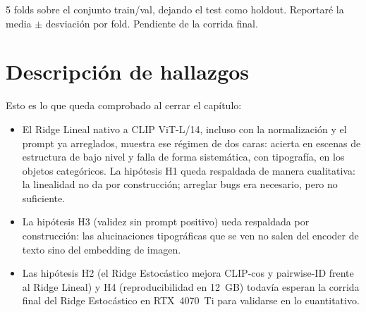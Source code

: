5 folds sobre el conjunto train/val, dejando el test como holdout. Reportaré la media $\pm$ 
desviación por fold. Pendiente de la corrida final.

\section{Descripción de hallazgos}

Esto es lo que queda comprobado al cerrar el capítulo:
\begin{itemize}
\item[•] El Ridge Lineal nativo a CLIP ViT-L/14, incluso con la normalización y el prompt ya 
arreglados, muestra ese régimen de dos caras: acierta en escenas de estructura de bajo nivel y 
falla de forma sistemática, con tipografía, en los objetos categóricos. La hipótesis H1 queda 
respaldada de manera cualitativa: la linealidad no da por construcción; arreglar bugs
era necesario, pero no suficiente.
\item[•] La hipótesis H3 (validez sin prompt positivo) ueda respaldada por
construcción: las alucinaciones tipográficas que se ven no salen del
encoder de texto sino del embedding de imagen.
\item[•] Las hipótesis H2 (el Ridge Estocástico mejora CLIP-cos y pairwise-ID frente al Ridge 
Lineal) y H4 (reproducibilidad en 12~GB) todavía esperan la corrida final del Ridge Estocástico 
en RTX~4070~Ti para validarse en lo cuantitativo.
\end{itemize}

\afterpage{\blankpage}
